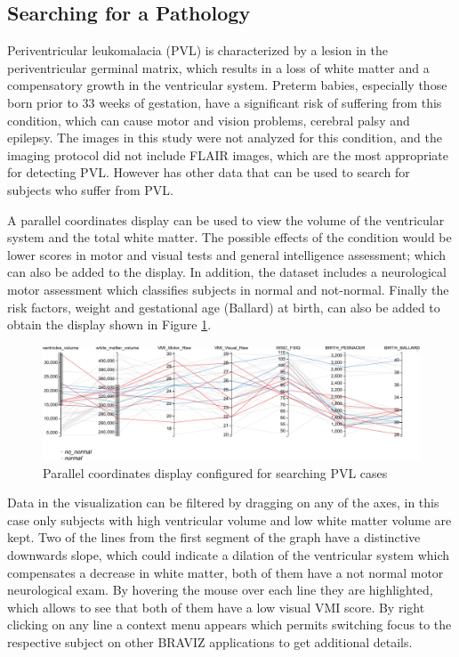 \documentclass[twocolumn]{svjour3}
\begin{document}
\subsection{Searching for a Pathology}

Periventricular leukomalacia (PVL) is characterized by a lesion in the periventricular germinal matrix, which results in a loss of white matter and a compensatory growth in the ventricular system. Preterm babies, especially those born prior to 33 weeks of gestation, have a significant risk of suffering from this condition, which can cause motor and vision problems, cerebral palsy and epilepsy.    
The images in this study were not analyzed for this condition, and the imaging protocol did not include FLAIR images, which are the most appropriate for detecting PVL. However has other data that can be used to search for subjects who suffer from PVL.

A parallel coordinates display can be used to view the volume of the ventricular system and the total white matter. The possible effects of the condition would be lower scores in motor and visual tests and general intelligence assessment; which can also be added to the display. In addition, the dataset includes a neurological motor assessment which classifies subjects in normal and not-normal.  Finally the risk factors, weight and gestational age (Ballard) at birth, can also be added to obtain the display shown in Figure \ref{fig_parallel}.

\begin{figure}
\begin{center}
\includegraphics[width=\linewidth]{figures/cases/parallel_coordinates}
\end{center}
 \caption{\label{fig_parallel}Parallel coordinates display configured for searching PVL cases}
\end{figure}

Data in the visualization can be filtered by dragging on any of the axes, in this case only subjects with high ventricular volume and low white matter volume are kept. Two of the lines from the first segment of the graph have a distinctive downwards slope, which could indicate a dilation of the ventricular system which compensates a decrease in white matter, both of them have a not normal motor neurological exam. By hovering the mouse over each line they are highlighted, which allows to see that both of them have a low visual VMI score. By right clicking on any line a context menu appears which permits switching focus to the respective subject on other BRAVIZ applications to get additional details. 
\end{document}
